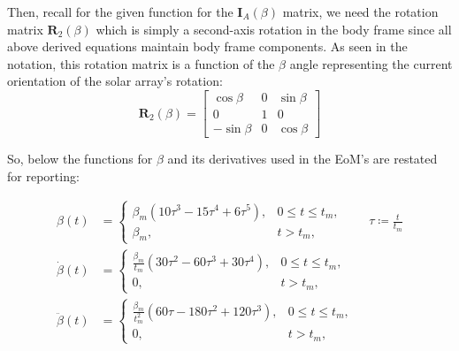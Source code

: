 \documentclass[titlepage]{article}
\begin{document}
Then, recall for the given function for the $\boldsymbol{I}_A(\beta)$ matrix, we need the rotation matrix $\boldsymbol{R}_2(\beta)$ which is simply a second-axis rotation in the body frame since all above derived equations maintain body frame components. As seen in the notation, this rotation matrix is a function of the $\beta$ angle representing the current orientation of the solar array's rotation:
\begin{equation}
	\boldsymbol{R}_2(\beta)=
	\begin{bmatrix}
		\cos\beta & 0 & \sin\beta \\
		0 & 1 & 0 \\
		-\sin\beta & 0 & \cos\beta
	\end{bmatrix}
	\label{eq:R2}
\end{equation}

So, below the functions for $\beta$ and its derivatives used in the EoM's are restated for reporting:

\begin{mdframed}[linewidth=1pt, innertopmargin=10pt, innerbottommargin=10pt]
	\begin{equation}
		\begin{split}
			\beta(t)&=
			\begin{cases}
				\beta_m\left(10\tau^3-15\tau^4+6\tau^5\right), & 0\leq t\leq t_m,\\
				\beta_m, & t>t_m,
			\end{cases}
			\qquad\tau\coloneqq\frac{t}{t_m} \\[6pt]
			\dot{\beta}(t)&=
			\begin{cases}
				\frac{\beta_m}{t_m}\left(30\tau^2-60\tau^3+30\tau^4\right), & 0\leq t\leq t_m,\\
				0, & t>t_m,
			\end{cases} \\[6pt]
			\ddot{\beta}(t)&=
			\begin{cases}
				\frac{\beta_m}{t_m^2}\left(60\tau-180\tau^2+120\tau^3\right), & 0\leq t\leq t_m,\\
				0, & t>t_m,
			\end{cases}
		\end{split}
		\label{eq:betas}
	\end{equation}
\end{mdframed}

\newpage
\end{document}

